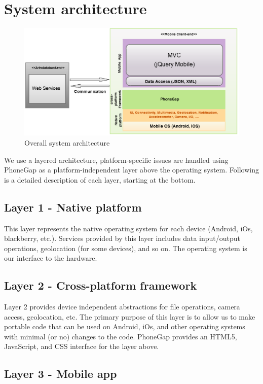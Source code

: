 \section{System architecture}
\begin{figure}[htb]
	\centering
	\includegraphics[width=1.0\textwidth]{architecture/architecture.png}
	\caption{Overall system architecture}
	\label{fig:architecture}
\end{figure}

We use a layered architecture, platform-specific issues are handled using
PhoneGap as a platform-independent layer above the operating system. Following
is a detailed description of each layer, starting at the bottom.

\subsection{Layer 1 - Native platform}

This layer represents the native operating system for each device (Android, iOs,
blackberry, etc.). Services provided by this layer includes data input/output
operations, geolocation (for some devices), and so on. The operating system is
our interface to the hardware.

\subsection{Layer 2 - Cross-platform framework}

Layer 2 provides device independent abstractions for file operations, camera
access, geolocation, etc. The primary purpose of this layer is to allow us to
make portable code that can be used on Android, iOs, and other operating systems
with minimal (or no) changes to the code. PhoneGap provides an HTML5,
JavaScript, and CSS interface for the layer above.

\subsection{Layer 3 - Mobile app}

